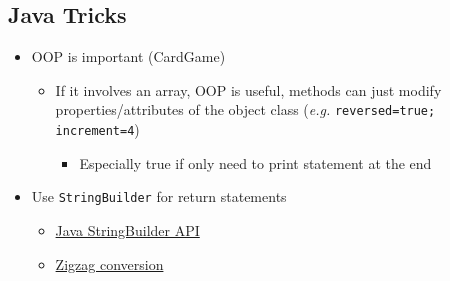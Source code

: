 \documentclass{article}
\newcommand{\eg}[0]{\textit{e.g. }}
\begin{document}
\begin{multicols}{2}
\section{Java Tricks}
\begin{itemize}
	\item OOP is important (CardGame)
	\begin{itemize}
		\item If it involves an array, OOP is useful, methods can just modify properties/attributes of the object class (\eg \texttt{reversed=true; increment=4})
		\begin{itemize}
			\item Especially true if only need to print statement at the end
		\end{itemize}
	\end{itemize}
	\item Use \texttt{StringBuilder} for return statements
	\begin{itemize}
		\item \href{https://docs.oracle.com/javase/7/docs/api/java/lang/StringBuilder.html}{Java StringBuilder API}
		\item \href{https://leetcode.com/problems/zigzag-conversion/solution/}{Zigzag conversion}
	\end{itemize}

\end{itemize}
\end{multicols}
\end{document}
